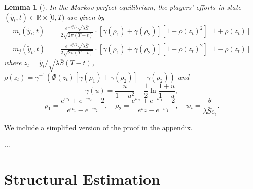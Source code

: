 \documentclass[a4paper, 11pt]{article}
\theoremstyle{plain} %
\newtheorem{lemma}{Lemma}
\begin{document}
\begin{lemma}[\citealt{ryvkin2022fight}]
In the Markov perfect equilibrium, the players’ efforts in state $(\tilde{y}_t, t) \in\mathbb{R}\times[0, T)$ are given by
\begin{equation*}
\begin{aligned}
m_{i}(\tilde{y}_t, t) &= \frac{e^{-z_t^2/2}\sqrt{\lambda\bar{S}}}{2\sqrt{2\pi(T-t)}} \cdot \left[\gamma(\rho_{1}) + \gamma(\rho_{2})\right]\left[1-\rho(z_t)^2\right]\left[1 + \rho(z_t)\right]\\
m_{j}(\tilde{y}_t, t) &= \frac{e^{-z_t^2/2}\sqrt{\lambda\bar{S}}}{2\sqrt{2\pi(T-t)}} \cdot 
 \left[\gamma(\rho_{1}) + \gamma(\rho_{2})\right]\left[1-\rho(z_t)^2\right]\left[1 - \rho(z_t)\right]
\end{aligned}
\end{equation*}
where $z_t = \tilde{y}_t / \sqrt{\lambda\bar{S}(T-t)}$, $\rho(z_t) = \gamma^{-1}\left(\Phi(z_t)\left[\gamma(\rho_{1})+\gamma(\rho_{2})\right]-\gamma(\rho_{2})\right)$ and 
\begin{equation*}
\gamma(u) = \frac{u}{1-u^2} + \frac{1}{2}\ln\frac{1+u}{1-u},
\end{equation*}
\begin{equation*}
\rho_{1} = \frac{e^{w_{1}}+e^{-w_{2}}-2}{e^{w_{1}}-e^{-w_{2}}},
\quad
\rho_{2} = \frac{e^{w_{2}}+e^{-w_{1}}-2}{e^{w_{2}}-e^{-w_{1}}},
\quad
w_{i} = \frac{\theta}{\lambda\bar{S}c_i}. 
\end{equation*}
\end{lemma}

We include a simplified version of the proof in the appendix.

...



















\section{Structural Estimation}








\newpage


\newpage
\appendix
\small
\end{document}
